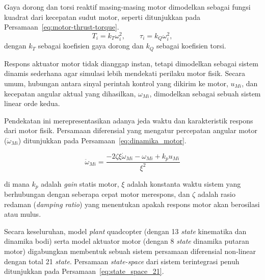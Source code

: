 \documentclass[12pt,a4paper]{report}
\numberwithin{equation}{chapter}
\begin{document}
Gaya dorong dan torsi reaktif masing-masing motor dimodelkan sebagai fungsi kuadrat dari kecepatan sudut motor, seperti ditunjukkan pada Persamaan~\ref{eq:motor-thrust-torque}.
\begin{equation}
    T_i = k_T\omega_i^2, \qquad \tau_i = k_Q\omega_i^2,
    \label{eq:motor-thrust-torque}
\end{equation}
dengan $k_T$ sebagai koefisien gaya dorong dan $k_Q$ sebagai koefisien torsi. 

Respons aktuator motor tidak dianggap instan, tetapi dimodelkan sebagai sistem dinamis sederhana agar simulasi lebih mendekati perilaku motor fisik. Secara umum, hubungan antara sinyal perintah kontrol yang dikirim ke motor, $u_{Mi}$, dan kecepatan angular aktual yang dihasilkan, $\omega_{Mi}$, dimodelkan sebagai sebuah sistem linear orde kedua. 

Pendekatan ini merepresentasikan adanya jeda waktu dan karakteristik respons dari motor fisik. Persamaan diferensial yang mengatur percepatan angular motor ($\ddot{\omega}_{Mi}$) ditunjukkan pada Persamaan~\ref{eq:dinamika_motor}.

\begin{equation}
    \ddot{\omega}_{Mi} = \frac{-2 \zeta \xi \dot{\omega}_{Mi} - \omega_{Mi} + k_p u_{Mi}}{\xi^2}
    \label{eq:dinamika_motor}
\end{equation}

di mana $k_p$ adalah \textit{gain} statis motor, $\xi$ adalah konstanta waktu sistem yang berhubungan dengan seberapa cepat motor merespons, dan $\zeta$ adalah rasio redaman (\textit{damping ratio}) yang menentukan apakah respons motor akan berosilasi atau mulus.

Secara keseluruhan, model \textit{plant} quadcopter (dengan 13 \textit{state} kinematika dan dinamika bodi) serta model aktuator motor (dengan 8 \textit{state} dinamika putaran motor) digabungkan membentuk sebuah sistem persamaan diferensial non-linear dengan total 21 \textit{state}. Persamaan \textit{state-space} dari sistem terintegrasi penuh ditunjukkan pada Persamaan~\ref{eq:state_space_21}.
\end{document}
